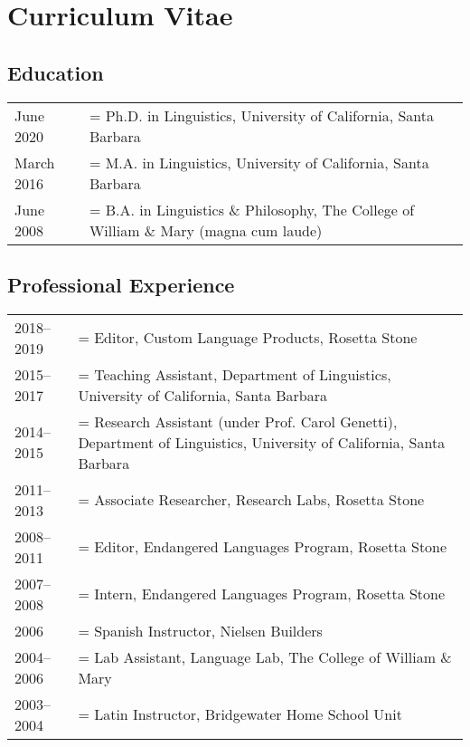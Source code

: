 \newlength{\datewidth}
\setlength{\datewidth}{6em}

\renewcommand{\arraystretch}{1.5}

\newenvironment{cvsection}[1]
{
  \subsection*{#1}
  \begin{longtabu} to \textwidth { p{\datewidth} >{\hangindent=\defaulthang}X[l] }
}
{\end{longtabu}}

\singlespacing

\section*{Curriculum Vitae}
\label{sec:cv}

\begin{center}
  \theauthor
\end{center}

\begin{cvsection}{Education}
  June 2020  & Ph.D. in Linguistics, University of California, Santa Barbara\\
  March 2016 & M.A. in Linguistics, University of California, Santa Barbara\\
  June 2008  & B.A. in Linguistics \& Philosophy, The College of William \& Mary (magna cum laude)
\end{cvsection}

\begin{cvsection}{Professional Experience}
  2018--2019 & Editor, Custom Language Products, Rosetta Stone\\
  2015--2017 & Teaching Assistant, Department of Linguistics, University of California, Santa Barbara\\
  2014--2015 & Research Assistant (under Prof. Carol Genetti), Department of Linguistics, University of California, Santa Barbara\\
  2011--2013 & Associate Researcher, Research Labs, Rosetta Stone\\
  2008--2011 & Editor, Endangered Languages Program, Rosetta Stone\\
  2007--2008 & Intern, Endangered Languages Program, Rosetta Stone\\
  2006       & Spanish Instructor, Nielsen Builders\\
  2004--2006 & Lab Assistant, Language Lab, The College of William \& Mary\\
  2003--2004 & Latin Instructor, Bridgewater Home School Unit
\end{cvsection}

